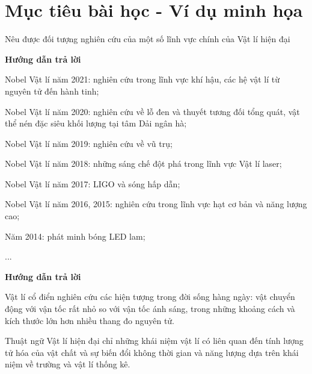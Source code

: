 \section{Mục tiêu bài học - Ví dụ minh họa}
\begin{dang}{Nêu được đối tượng nghiên cứu của một số lĩnh vực chính của Vật lí hiện đại}
	{	\begin{center}
			\textbf{Hướng dẫn trả lời}
		\end{center}
		
		Nobel Vật lí năm 2021: nghiên cứu trong lĩnh vực khí hậu, các hệ vật lí từ nguyên tử đến hành tinh;
		
		Nobel Vật lí năm 2020: nghiên cứu về lỗ đen và thuyết tương đối tổng quát, vật thể nén đặc siêu khối lượng tại tâm Dải ngân hà;
		
		Nobel Vật lí năm 2019: nghiên cứu về vũ trụ;
		
		Nobel Vật lí năm 2018: những sáng chế đột phá trong lĩnh vực Vật lí laser;
		
		Nobel Vật lí năm 2017: LIGO và sóng hấp dẫn;
		
		Nobel Vật lí năm 2016, 2015: nghiên cứu trong lĩnh vực hạt cơ bản và năng lượng cao;
		
		Năm 2014: phát minh bóng LED lam;
		
		...
		
	}
	{	\begin{center}
			\textbf{Hướng dẫn trả lời}
		\end{center}
		
	Vật lí cổ điển nghiên cứu các hiện tượng trong đời sống hàng ngày: vật chuyển động với vận tốc rất nhỏ so với vận tốc ánh sáng, trong những khoảng cách và kích thước lớn hơn nhiều thang đo nguyên tử.
	
	Thuật ngữ Vật lí hiện đại chỉ những khái niệm vật lí có liên quan đến tính lượng tử hóa của vật chất và sự biến đổi không thời gian và năng lượng dựa trên khái niệm về trường và vật lí thống kê.
		
	}
\end{dang}
